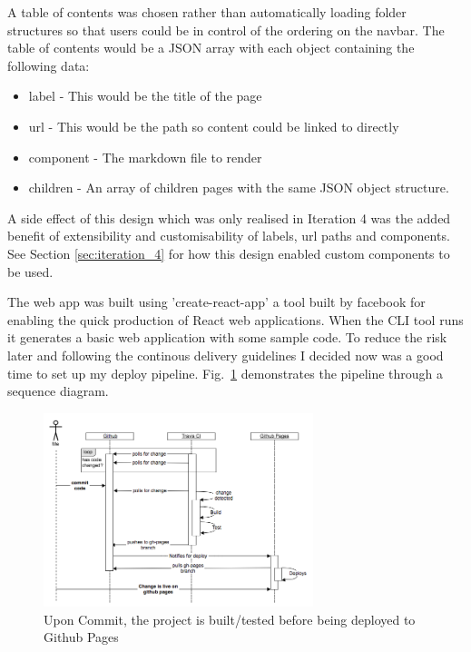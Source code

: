 A table of contents was
chosen rather than automatically loading folder structures so that users
could be in control of the ordering on the navbar. The table of contents
would be a JSON array with each object containing the following data:
\begin{itemize}
\item label - This would be the title of the page
\item url - This would be the path so content could be linked to directly
\item component - The markdown file to render
\item children - An array of children pages with the same JSON object structure.
\end{itemize}
A side effect of this design which was only realised in Iteration 4 was the
added benefit of extensibility and customisability of labels, url paths and
components. See Section \ref{sec:iteration_4} for how this design enabled custom
components to be used.

The web app was built using 'create-react-app' \citep{CreateReactApp} a tool
built by facebook for enabling the quick production of React web applications.
When the CLI tool runs it generates a basic web application with some sample
code. To reduce the risk later and following the continous delivery
guidelines \citep{ContinuousDelivery} I decided now was a good time to set up
my deploy pipeline. Fig.~\ref{fig:cd_pipeline} demonstrates the pipeline
through a sequence diagram.

\begin{figure}[H]
\centering
\includegraphics[width=0.7\textwidth]{figures/deploy_pipeline}
\captionsetup{justification=centering}
\caption{Upon Commit, the project is built/tested before being deployed to
Github Pages
\label{fig:cd_pipeline}}
\end{figure}

